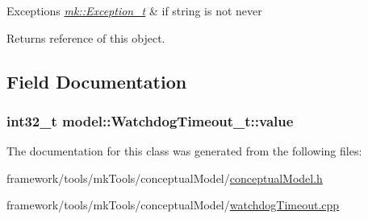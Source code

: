 \begin{DoxyExceptions}{Exceptions}
{\em \hyperlink{classmk_1_1_exception__t}{mk\+::\+Exception\+\_\+t}} & if string is not \textquotesingle{}never\textquotesingle{}\\
\hline
\end{DoxyExceptions}
\begin{DoxyReturn}{Returns}
reference of this object. 
\end{DoxyReturn}


\subsection{Field Documentation}
\subsubsection[{\texorpdfstring{value}{value}}]{\setlength{\rightskip}{0pt plus 5cm}int32\+\_\+t model\+::\+Watchdog\+Timeout\+\_\+t\+::value\hspace{0.3cm}{\ttfamily [private]}}\hypertarget{classmodel_1_1_watchdog_timeout__t_a2fd5f992faed12ac8738e13e2ea4a0c5}{}\label{classmodel_1_1_watchdog_timeout__t_a2fd5f992faed12ac8738e13e2ea4a0c5}


The documentation for this class was generated from the following files\+:\begin{DoxyCompactItemize}
\item 
framework/tools/mk\+Tools/conceptual\+Model/\hyperlink{conceptual_model_8h}{conceptual\+Model.\+h}\item 
framework/tools/mk\+Tools/conceptual\+Model/\hyperlink{watchdog_timeout_8cpp}{watchdog\+Timeout.\+cpp}\end{DoxyCompactItemize}
